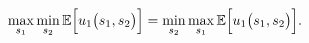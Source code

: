 \documentclass[
    preview, 
    varwidth = 11cm, 
    border = {0pt 10pt 1pt 1pt}
    ]{standalone} %
\begin{document}

    




    \[
        \max_{s_1} \min_{s_2} \mathbb{E}\Big[u_1{\big( s_1, s_2 \big)}\Big] = 
        \min_{s_2} \max_{s_1} \mathbb{E}\Big[u_1{\big( s_1, s_2 \big)}\Big].
    \]



\end{document}
